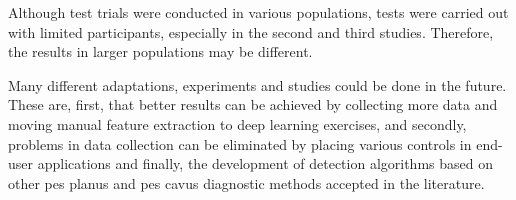 Although test trials were conducted in various populations, tests were carried out with limited participants, especially in the second and third studies. Therefore, the results in larger populations may be different.

Many different adaptations, experiments and studies could be done in the future. These are, first, that better results can be achieved by collecting more data and moving manual feature extraction to deep learning exercises, and secondly, problems in data collection can be eliminated by placing various controls in end-user applications and finally, the development of detection algorithms based on other pes planus and pes cavus diagnostic methods accepted in the literature.